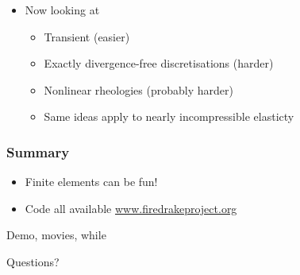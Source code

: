 \documentclass[presentation, 10pt]{beamer}
\begin{document}
\begin{frame}
\begin{itemize}
\begin{columns}
\begin{column}{0.4\pagewidth}
      \end{column}
    \end{columns}
  \item Now looking at
    \begin{itemize}
    \item Transient (easier)
    \item Exactly divergence-free discretisations (harder)
    \item Nonlinear rheologies (probably harder)
    \item Same ideas apply to nearly incompressible elasticty
    \end{itemize}
  \end{itemize}
\end{frame}

\begin{frame}
  \frametitle{Summary}
  \begin{itemize}
  \item Finite elements can be fun!
  \item Code all available \url{www.firedrakeproject.org}
  \end{itemize}

  \begin{center}
    \LARGE

    Demo, movies, while

    Questions?
  \end{center}
\end{frame}
\end{document}
